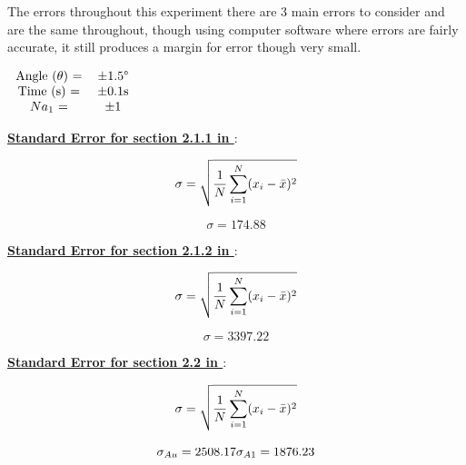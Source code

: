 \documentclass[12pt]{article}
\begin{document}
The errors throughout this experiment there are 3 main errors to consider and   are the same throughout, though using computer software where errors are fairly accurate, it still produces a margin for error though very small. 

\begin{table}[H]
\begin{center}
 \begin{math}
 \begin{tabular}{c c c}
 Angle ($\theta$)  = & $\pm$1.5\textdegree \\
 Time (s) = & $\pm$0.1s \\
 $Na_1$ = & $\pm$1 \\
 \end{tabular}
 \end{math}
 \caption{Error Analysis.}
 \label{Error Analysis}
\end{center}
\end{table}

\textbf{\underline{Standard Error for section 2.1.1 in \cite{Exp.6-2019}}}:

\begin{equation}
\sigma = \sqrt{\dfrac{1}{N} \sum_{i=1}^{N}(x_i - \Bar{x})^2}
\end{equation}

\begin{equation}
\sigma = 174.88
\end{equation}

\textbf{\underline{Standard Error for section 2.1.2 in \cite{Exp.6-2019}}}:

\begin{equation}
\sigma = \sqrt{\dfrac{1}{N} \sum_{i=1}^{N}(x_i - \Bar{x})^2}
\end{equation}

\begin{equation}
\sigma = 3397.22
\end{equation}

\textbf{\underline{Standard Error for section 2.2 in \cite{Exp.6-2019}}}:

\begin{equation}
\sigma = \sqrt{\dfrac{1}{N} \sum_{i=1}^{N}(x_i - \Bar{x})^2}
\end{equation}

\begin{equation}
{\sigma}_{Au} = 2508.17 \\
{\sigma}_{A1} = 1876.23
\end{equation}

\end{document}
